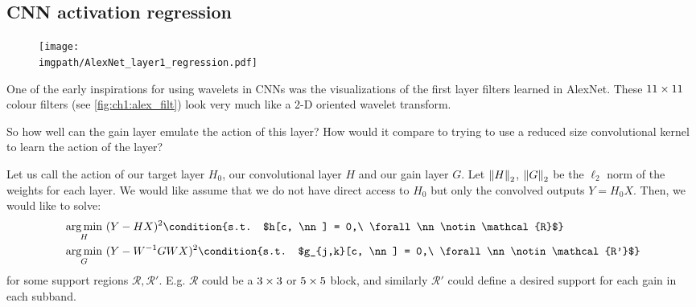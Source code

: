\subsection{CNN activation regression}\label{sec:ch6:regression}
\begin{figure}[t]
  \centering
  \texttt{[image: \\imgpath/AlexNet\_layer1\_regression.pdf]}
  \label{fig:ch6:gainlayer_regression}
\end{figure}
One of the early inspirations for using wavelets in CNNs was the visualizations
of the first layer filters learned in AlexNet. These $11\times 11$ colour filters
(see \autoref{fig:ch1:alex_filt}) look very much like a 2-D oriented wavelet transform.

So how well can the gain layer emulate the action of this layer? How would it
compare to trying to use a reduced size convolutional kernel to learn the 
action of the layer? 

Let us call the action of our target layer $H_0$, our convolutional layer $H$
and our gain layer $G$. Let ${\left\lVert H \right\rVert}_{2}$, ${\left\lVert G \right\rVert}_{2}$ be the $\ell_2$ norm
of the weights for each layer. We would like assume that we do not have direct
access to $H_0$ but only the convolved outputs $Y=H_0 X$. Then, we would like to solve:
\begin{align}
  & \argmin_{H}\ (Y - HX)^2 %
  \condition{s.t. $h[c, \nn] = 0,\ \forall \nn \notin \mathcal{R}$} \label{eq:ch6:conv_regression}\\
  & \argmin_{G}\ (Y - W^{-1}GWX)^2 %
  \condition{s.t. $g_{j,k}[c, \nn] = 0,\ \forall \nn \notin \mathcal{R'}$} \label{eq:ch6:gain_regression}
\end{align}
for some support regions $\mathcal{R},\mathcal{R'}$. E.g. $\mathcal{R}$ could be a $3\times3$ or $5\times5$ 
block, and similarly $\mathcal{R'}$ could define a desired support for each gain in each 
subband. 


